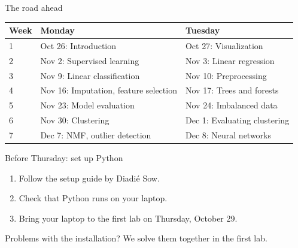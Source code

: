 \documentclass[handout,aspectratio=169,t,9pt]{beamer}
\begin{document}
\begin{frame}{The road ahead}
  \footnotesize
  \begin{tabular}{@{}lll@{}}
    \toprule
    \textbf{Week} & \textbf{Monday} & \textbf{Tuesday} \\
    \midrule
    1 & Oct 26: Introduction              & Oct 27: Visualization \\
    2 & Nov 2: Supervised learning        & Nov 3: Linear regression \\
    3 & Nov 9: Linear classification      & Nov 10: Preprocessing \\
    4 & Nov 16: Imputation, feature selection & Nov 17: Trees and forests \\
    5 & Nov 23: Model evaluation          & Nov 24: Imbalanced data \\
    6 & Nov 30: Clustering                & Dec 1: Evaluating clustering \\
    7 & Dec 7: NMF, outlier detection     & Dec 8: Neural networks \\
    \bottomrule
  \end{tabular}

  \vfill
  \normalsize
\end{frame}

\begin{frame}{Before Thursday: set up Python}
  \vspace{0.3cm}
  \begin{enumerate}
    \item Follow the setup guide by Diadi\'{e} Sow.
    \item Check that Python runs on your laptop.
    \item Bring your laptop to the first lab on Thursday, October 29.
  \end{enumerate}

  \vfill
  \begin{takeaway}
    Problems with the installation?  We solve them together in the first
    lab.
  \end{takeaway}
\end{frame}
\end{document}
